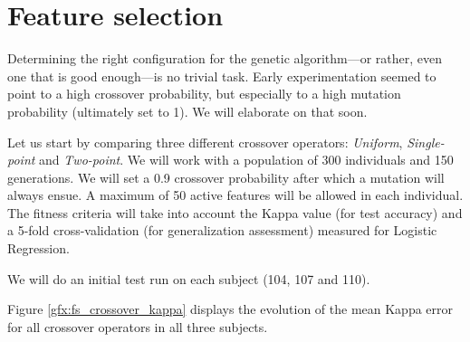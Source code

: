 \newpage

\section{Feature selection}\label{sec:res_fs}

	Determining the right configuration for the genetic algorithm---or rather, even one that is good enough---is no trivial task. Early experimentation seemed to point to a high crossover probability, but especially to a high mutation probability (ultimately set to 1). We will elaborate on that soon.

	Let us start by comparing three different crossover operators: \textit{Uniform}, \textit{Single-point} and \textit{Two-point}. We will work with a population of 300 individuals and 150 generations. We will set a 0.9 crossover probability after which a mutation will always ensue. A maximum of 50 active features will be allowed in each individual. The fitness criteria will take into account the Kappa value (for test accuracy) and a 5-fold cross-validation (for generalization assessment) measured for Logistic Regression.

	We will do an initial test run on each subject (104, 107 and 110). 

	Figure \ref{gfx:fs_crossover_kappa} displays the evolution of the mean Kappa error for all crossover operators in all three subjects.

